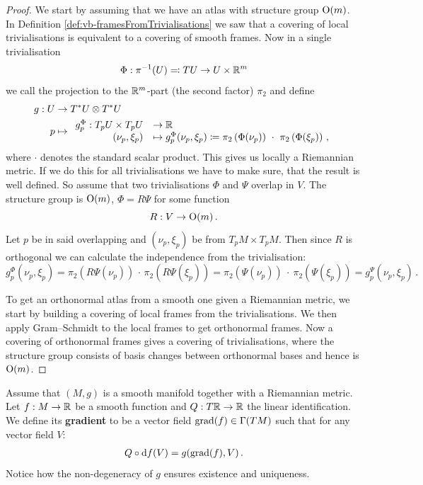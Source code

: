 \begin{proof}
	We start by assuming that we have an atlas with structure group $\operatorname{\mathrm{O}}(m)$. In Definition \ref{def:vb-framesFromTrivialisations} we saw that a covering of local trivialisations is equivalent to a covering of smooth frames. Now in a single trivialisation
	\begin{equation*}
		\Phi: \pi^{-1}(U)\eqcolon TU \to U\times \mathbb{R}^m
	\end{equation*} we call the projection to the $\mathbb{R}^m$-part (the second factor) $\pi_2$ and define 
\begin{align*}
	g: U &\to T^*U \otimes T^*U \\
	p&\mapsto  \begin{array}{rl}
		g_p^\Phi: T_pU\times T_pU &\to \mathbb{R} \\
		(\nu_p,\xi_p)    &\mapsto g_p^\Phi(\nu_p,\xi_p)\coloneq \pi_2\left(\Phi(\nu_p)\right)~\cdot~ \pi_2 \left(\Phi(\xi_p)\right)\,,
	\end{array} 
\end{align*} where $\cdot$ denotes the standard scalar product. This gives us locally a Riemannian metric. If we do this for all trivialisations we have to make sure, that the result is well defined. So assume that two trivialisations $\Phi$ and $\Psi$ overlap in $V$. The structure group is $\operatorname{\mathrm{O}}(m)$, $\Phi=R\Psi$ for some function 
\begin{equation*}
	R: V\to \operatorname{\mathrm{O}}(m)\,.
\end{equation*} Let $p$ be in said overlapping and $(\nu_p,\xi_p)$ be from $T_pM\times T_pM$. Then since $R$ is orthogonal we can calculate the independence from the trivialisation:
\begin{equation*}
	g_p^\Phi(\nu_p,\xi_p)=\pi_2\left(R\Psi(\nu_p)\right)\,\cdot \, \pi_2 \left(R\Psi(\xi_p)\right)=\pi_2\left(\Psi(\nu_p)\right)~\cdot~ \pi_2 \left(\Psi(\xi_p)\right)=	g_p^\Psi(\nu_p,\xi_p)\,.
\end{equation*}

To get an orthonormal atlas from a smooth one given a Riemannian metric, we start by building a covering of local frames from the trivialisations. We then apply Gram--Schmidt to the local frames to get orthonormal frames. Now a covering of orthonormal frames gives a covering of trivialisations, where the structure group consists of basis changes between orthonormal bases and hence is $\operatorname{\mathrm{O}}(m)$.
\end{proof}

\begin{definition}
	Assume that $(M,g)$ is a smooth manifold together with a Riemannian metric. Let $f:M\to \mathbb{R}$ be a smooth function and $Q: T\mathbb{R}\to \mathbb{R}$ the linear identification. We define its \textbf{gradient} to be a vector field $\mathrm{grad}(f)\in \Gamma(TM)$ such that for any vector field $V$:
	\begin{align*}
		 Q\circ \mathop{}\!\mathrm{d} f (V) = g(\mathrm{grad}(f),V) \, .
	\end{align*} Notice how the non-degeneracy of $g$ ensures existence and uniqueness. 
\end{definition}


